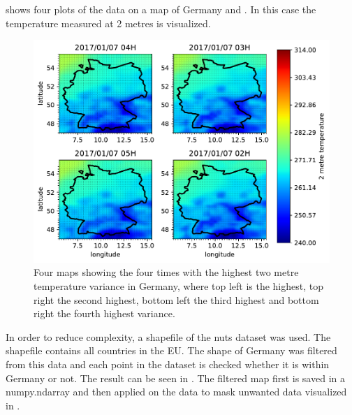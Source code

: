  shows four plots of the data on a map of Germany and . In this case the temperature measured at 2 metres is visualized.\\


\begin{figure}[h!]%
\centering
\includegraphics[width=\textwidth]{plots/t2m/bundles/maxvar4_maps}%
\caption{Four maps showing the four times with the highest two metre temperature variance in Germany, where top left is the highest, top right the second highest, bottom left the third highest and bottom right the fourth highest variance.}%
\label{fig:maxvar4_maps}%
\end{figure}

In order to reduce complexity, a shapefile of the \acrshort{nuts} dataset was used. The shapefile contains all countries in the EU. The shape of Germany was filtered from this data and each point in the dataset is checked whether it is within Germany or not. The result can be seen in . The filtered map first is saved in a numpy.ndarray and then applied on the data to mask unwanted data visualized in .\\

